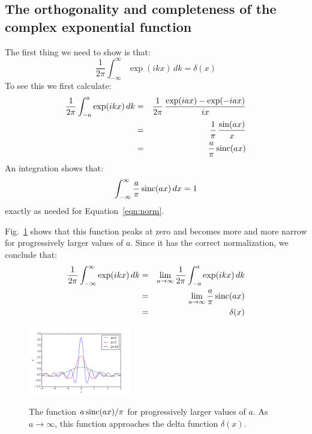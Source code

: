 \documentclass[12pt]{book}
\begin{document}
\subsection{The orthogonality and completeness of the complex exponential function}

The first thing we need to show is that:
\begin{equation} \label{eqn:delta}
\frac{1}{2\pi} \int_{-\infty}^{\infty} \exp(ikx) \, dk = \delta(x)
\end{equation}
To see this we first calculate:
\begin{eqnarray*} \label{eqn:delta}
\frac{1}{2\pi} \int_{-a}^{a} \exp(ikx) \, dk &=& \frac{1}{2\pi} \, \frac{\exp(iax)-\exp(-iax)}{ix}\\
&=& \frac{1}{\pi} \, \frac{\sin(ax)}{x} \\
&=& \frac{a}{\pi} \, {\rm sinc}(ax)
\end{eqnarray*}
An integration shows that:
\begin{eqnarray}
\int_{-\infty}^{\infty} \frac{a}{\pi} \, {\rm sinc}(ax) \, dx = 1
\end{eqnarray}
exactly as needed for Equation~\ref{eqn:norm}.

Fig.~\ref{fig:sinc} shows that this function peaks at zero and becomes more and more narrow for progressively larger values of $a$.  Since it has the correct normalization, we conclude that:
\begin{eqnarray*}
\frac{1}{2\pi} \int_{-\infty}^{\infty} \exp(ikx) \, dk &=& \lim_{a\to\infty} \frac{1}{2\pi} \int_{-a}^{a} \exp(ikx) \, dk \\
&=& \lim_{a\to\infty} \frac{a}{\pi} \, {\rm sinc}(ax) \\ 
&=& \delta(x)
\end{eqnarray*}

\begin{figure}[thb]
\begin{center}
{\includegraphics[width=0.40\textwidth]{figs/sinc.png}}
\end{center}
\caption{\label{fig:sinc} The function $a \, {\rm sinc}(ax)/\pi$ for progressively larger values of $a$.  As $a \to \infty$, this function approaches the delta function $\delta(x)$.}
\end{figure}
\end{document}
